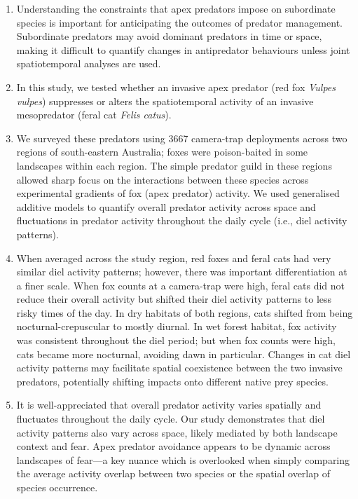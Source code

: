 \documentclass[]{elsarticle} %
\begin{document}
\begin{enumerate}
\def\labelenumi{\arabic{enumi}.}
\item
  Understanding the constraints that apex predators impose on subordinate species is important for anticipating the outcomes of predator management. Subordinate predators may avoid dominant predators in time or space, making it difficult to quantify changes in antipredator behaviours unless joint spatiotemporal analyses are used.
\item
  In this study, we tested whether an invasive apex predator (red fox \emph{Vulpes vulpes}) suppresses or alters the spatiotemporal activity of an invasive mesopredator (feral cat \emph{Felis catus}).
\item
  We surveyed these predators using 3667 camera-trap deployments across two regions of south-eastern Australia; foxes were poison-baited in some landscapes within each region. The simple predator guild in these regions allowed sharp focus on the interactions between these species across experimental gradients of fox (apex predator) activity. We used generalised additive models to quantify overall predator activity across space and fluctuations in predator activity throughout the daily cycle (i.e., diel activity patterns).
\item
  When averaged across the study region, red foxes and feral cats had very similar diel activity patterns; however, there was important differentiation at a finer scale. When fox counts at a camera-trap were high, feral cats did not reduce their overall activity but shifted their diel activity patterns to less risky times of the day. In dry habitats of both regions, cats shifted from being nocturnal-crepuscular to mostly diurnal. In wet forest habitat, fox activity was consistent throughout the diel period; but when fox counts were high, cats became more nocturnal, avoiding dawn in particular. Changes in cat diel activity patterns may facilitate spatial coexistence between the two invasive predators, potentially shifting impacts onto different native prey species.
\item
  It is well-appreciated that overall predator activity varies spatially and fluctuates throughout the daily cycle. Our study demonstrates that diel activity patterns also vary across space, likely mediated by both landscape context and fear. Apex predator avoidance appears to be dynamic across landscapes of fear---a key nuance which is overlooked when simply comparing the average activity overlap between two species or the spatial overlap of species occurrence.
\end{enumerate}
\end{document}
